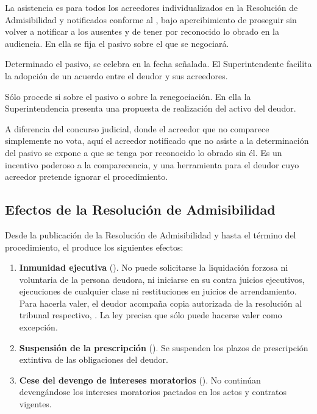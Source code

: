 \begin{description}[leftmargin=0pt,style=nextline,font=\sffamily\bfseries]
  \item[Audiencia de determinación del pasivo (\art{265})] La asistencia es
   para todos los acreedores individualizados en la Resolución de
  Admisibilidad y notificados conforme al , bajo apercibimiento de proseguir sin
  volver a notificar a los ausentes y de tener por reconocido lo obrado en la audiencia. En
  ella se fija el pasivo sobre el que se negociará.

  \item[Audiencia de renegociación (\art{266})] Determinado el pasivo, se celebra en la
  fecha señalada. El Superintendente facilita la adopción de un acuerdo entre el deudor y
  sus acreedores.

  \item[Audiencia de ejecución (\art{267})] Sólo procede si  sobre el pasivo o sobre la renegociación. En ella la Superintendencia presenta
  una propuesta de realización del activo del deudor.
\end{description}

\begin{foco}
A diferencia del concurso judicial, donde el acreedor que no comparece simplemente no vota,
aquí el acreedor notificado que no asiste a la determinación del pasivo se expone a que se
tenga por reconocido lo obrado sin él. Es un incentivo poderoso a la comparecencia, y una
herramienta para el deudor cuyo acreedor pretende ignorar el procedimiento.
\end{foco}

\subsection{Efectos de la Resolución de Admisibilidad}

Desde la publicación de la Resolución de Admisibilidad y hasta el término del
procedimiento, el  produce los siguientes efectos:

\begin{enumerate}
  \item \textbf{Inmunidad ejecutiva} (). No puede solicitarse la liquidación
  forzosa ni voluntaria de la persona deudora, ni iniciarse en su contra juicios
  ejecutivos, ejecuciones de cualquier clase ni restituciones en juicios de arrendamiento.
  Para hacerla valer, el deudor acompaña copia autorizada de la resolución al tribunal
  respectivo, . La
  ley precisa que sólo puede hacerse valer como excepción.

  \item \textbf{Suspensión de la prescripción} (). Se suspenden los plazos de
  prescripción extintiva de las obligaciones del deudor.

  \item \textbf{Cese del devengo de intereses moratorios} (). No continúan
  devengándose los intereses moratorios pactados en los actos y contratos vigentes.
\end{enumerate}

